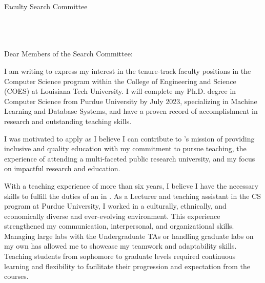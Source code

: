 \documentclass[11pt]{article}
\renewcommand*\paragraph[1]{}
\begin{document}
\thispagestyle{plain}

\pagestyle{empty}

Faculty Search Committee \\
\DepartmentName \\
\SchoolName \\
\InstitutionName \\
\DepartmentAddress

Dear Members of the Search Committee:

I am writing to express my interest in the tenure-track faculty positions in the Computer Science program within the College of Engineering and Science (COES) at Louisiana Tech University. I will complete my Ph.D. degree in Computer Science from Purdue University by July 2023, specializing in Machine Learning and Database Systems, and have a proven record of accomplishment in research and outstanding teaching skills.

I was motivated to apply 
as I believe I can contribute to \shortInstitutionName{}'s mission of providing 
inclusive and quality
education with my commitment to pursue teaching, the experience of attending a multi-faceted public research university, and my focus on impactful research and education. 


\paragraph{2 and 3) Demonstrated ability to teach and interact with both undergraduate and graduate students}
With a teaching 
experience of more than six years, I believe I have the necessary skills to fulfill the duties of an \PositionName{} in \DepartmentName{}.
As a Lecturer and teaching assistant in the CS program at Purdue University, I worked in a culturally, ethnically, and economically diverse and ever-evolving environment. This experience strengthened my communication, interpersonal, and organizational skills. Managing large labs with the Undergraduate TAs or handling graduate labs on my own has allowed me to showcase my teamwork and adaptability skills. Teaching students from sophomore to graduate levels required continuous learning and flexibility to facilitate their progression and expectation from the courses. 
\end{document}
